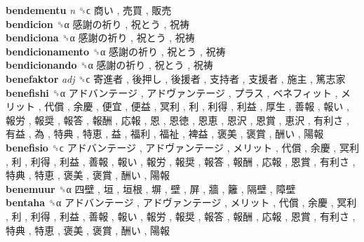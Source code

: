\textbf{bendementu} \emph{n}  ␝ϲ   商い ,  売買 ,  販売   \\
\textbf{bendicion} ␝α   感謝の祈り ,  祝とう ,  祝祷   \\
\textbf{bendiciona} ␝α   感謝の祈り ,  祝とう ,  祝祷   \\
\textbf{bendicionamento} ␝α   感謝の祈り ,  祝とう ,  祝祷   \\
\textbf{bendicionando} ␝α   感謝の祈り ,  祝とう ,  祝祷   \\
\textbf{benefaktor} \emph{adj}  ␝ϲ   寄進者 ,  後押し ,  後援者 ,  支持者 ,  支援者 ,  施主 ,  篤志家   \\
\textbf{benefishi} ␝α   アドバンテージ ,  アドヴァンテージ ,  プラス ,  ベネフィット ,  メリット ,  代償 ,  余慶 ,  便宜 ,  便益 ,  冥利 ,  利 ,  利得 ,  利益 ,  厚生 ,  善報 ,  報い ,  報労 ,  報奨 ,  報答 ,  報酬 ,  応報 ,  恩 ,  恩徳 ,  恩恵 ,  恩沢 ,  恩賞 ,  恵沢 ,  有利さ ,  有益 ,  為 ,  特典 ,  特恵 ,  益 ,  福利 ,  福祉 ,  裨益 ,  褒美 ,  褒賞 ,  酬い ,  陽報   \\
\textbf{benefisio} ␝ϲ   アドバンテージ ,  アドヴァンテージ ,  メリット ,  代償 ,  余慶 ,  冥利 ,  利 ,  利得 ,  利益 ,  善報 ,  報い ,  報労 ,  報奨 ,  報答 ,  報酬 ,  応報 ,  恩賞 ,  有利さ ,  特典 ,  特恵 ,  褒美 ,  褒賞 ,  酬い ,  陽報   \\
\textbf{benemuur} ␝α   四壁 ,  垣 ,  垣根 ,  塀 ,  壁 ,  屏 ,  牆 ,  籬 ,  隔壁 ,  障壁   \\
\textbf{bentaha} ␝α   アドバンテージ ,  アドヴァンテージ ,  メリット ,  代償 ,  余慶 ,  冥利 ,  利 ,  利得 ,  利益 ,  善報 ,  報い ,  報労 ,  報奨 ,  報答 ,  報酬 ,  応報 ,  恩賞 ,  有利さ ,  特典 ,  特恵 ,  褒美 ,  褒賞 ,  酬い ,  陽報   \\
